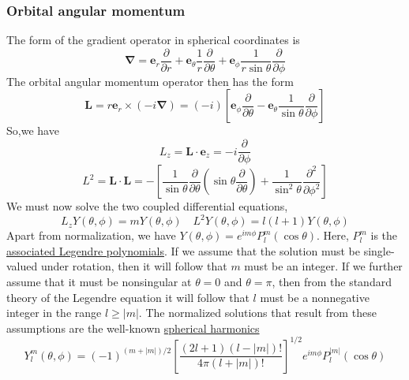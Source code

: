 \subsubsection{Orbital angular momentum}
The form of the gradient operator in spherical coordinates is
\[\bm{\nabla} = \bm{e}_r \frac{\partial}{\partial r} + \bm{e}_{\theta} \frac{1}{r} \frac{\partial}{\partial \theta} + \bm{e}_{\phi} \frac{1}{r\sin\theta} \frac{\partial}{\partial \phi}\]
The orbital angular momentum operator then has the form
\[\bm{L} = r\bm{e}_r \times (-i\bm{\nabla}) = (-i) \left[ \bm{e}_{\phi} \frac{\partial}{\partial \theta} - \bm{e}_{\theta} \frac{1}{\sin\theta} \frac{\partial}{\partial \phi} \right]\]
So,we have
\[L_z = \bm{L}\cdot\bm{e}_z = -i\frac{\partial}{\partial \phi}\]
\[L^2 = \bm{L}\cdot\bm{L} = - \left [ \frac{1}{\sin\theta} \frac{\partial }{\partial \theta} (\sin\theta \frac{\partial }{\partial \theta}) + \frac{1}{\sin^2\theta} \frac{\partial^2}{\partial \phi^2}  \right ]\]
We must now solve the two coupled differential equations,
\[L_z Y(\theta,\phi) = m Y(\theta,\phi) \quad L^2 Y(\theta,\phi) = l(l+1) Y(\theta,\phi)\]
Apart from normalization, we have $Y(\theta,\phi) = e^{im\phi}P_l^m(\cos\theta)$. Here, $P_l^m$ is the \href{https://en.wikipedia.org/wiki/Associated_Legendre_polynomials}{associated Legendre polynomials}. If we assume that the solution must be single-valued under rotation, then it will follow that $m$ must be an integer. If we further assume that it must be nonsingular at $\theta = 0$ and $\theta = \pi$, then from the standard theory of the Legendre equation it will follow that $l$ must be a nonnegative integer in the range $l \geq |m|$. The normalized solutions that result from these assumptions are the well-known \href{https://en.wikipedia.org/wiki/Spherical_harmonics}{spherical harmonics}
\[Y_l^m(\theta,\phi) = (-1)^{(m+|m|)/2} \left [\frac{(2l+1)(l-|m|)!}{4\pi(l+|m|)!}  \right ]^{1/2}e^{im\phi} P_l^{|m|}(\cos\theta)\]
